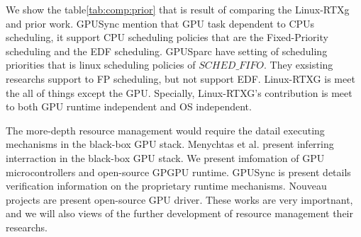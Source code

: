 We show the table\ref{tab:comp:prior} that is result of comparing the Linux-RTXg and prior work.
GPUSync mention that GPU task dependent to CPUs scheduling, it support CPU scheduling policies that are the Fixed-Priority scheduling and the EDF scheduling.
GPUSparc have setting of scheduling priorities that is linux scheduling policies of $SCHED\_FIFO$.
They exsisting researchs support to FP scheduling, but not support EDF.
Linux-RTXG is meet the all of things except the GPU.
Specially, Linux-RTXG's contribution is meet to both GPU runtime independent and OS independent.

The more-depth resource management would require the datail executing mechanisms in the black-box GPU stack.
Menychtas et al. present inferring interraction in the black-box GPU stack\cite{menychtas2013enabling}.
We present imfomation of GPU microcontrollers\cite{fujii:apsys2013} and open-source GPGPU runtime\cite{kato:gdev}.
GPUSync is present details verification information on the proprietary runtime mechanisms.
Nouveau projects are present open-source GPU driver\cite{nouveau}.
These works are very importnant, and we will also views of the further development of resource management their researchs.


